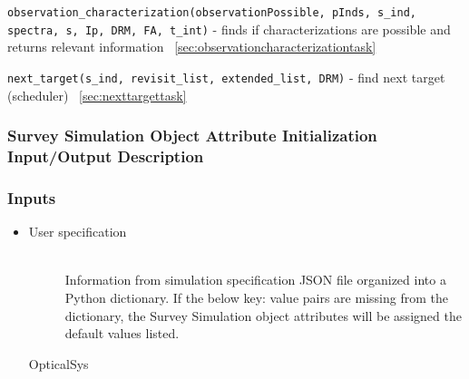 \documentclass[cleanfoot]{asme2ej}
\begin{document}
\verb+observation_characterization(observationPossible, pInds, s_ind, spectra, s, Ip, DRM, FA, t_int)+ - finds if characterizations are possible and returns relevant information ~\ref{sec:observationcharacterizationtask}

\verb+next_target(s_ind, revisit_list, extended_list, DRM)+ - find next target (scheduler) ~\ref{sec:nexttargettask}

\subsubsection{Survey Simulation Object Attribute Initialization Input/Output Description}
\subsubsection*{Inputs}
\begin{itemize}
    \item 
    \begin{description}
        \item[User specification] \hfill \\
        Information from simulation specification JSON file organized into a Python dictionary. If the below key: value pairs are missing from the dictionary, the Survey Simulation object attributes will be assigned the default values listed.
        \item[OpticalSys] \hfill \\

\end{description}
\end{itemize}
\end{document}

